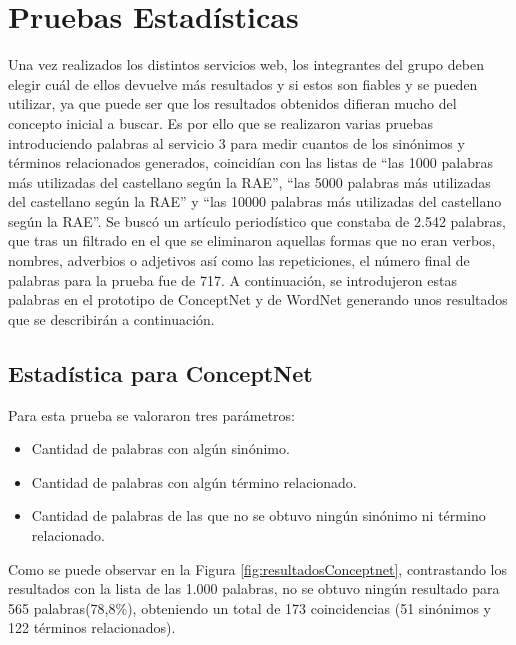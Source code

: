 \section{Pruebas Estadísticas}
\label{cap:sec:pruebasEstadisticas}
Una vez realizados los distintos servicios web, los integrantes del grupo deben elegir cuál de ellos devuelve más resultados y si estos son fiables y se pueden utilizar, ya que puede ser que los resultados obtenidos difieran mucho del concepto inicial a buscar.
Es por ello que se realizaron varias pruebas introduciendo palabras al servicio 3 para medir cuantos de los sinónimos y términos relacionados generados, coincidían con las listas de ``las 1000 palabras más utilizadas del castellano según la RAE'', ``las 5000 palabras más utilizadas del castellano según la RAE'' y ``las 10000 palabras más utilizadas del castellano según la RAE''. Se buscó un artículo periodístico que constaba de 2.542 palabras, que tras un filtrado en el que se eliminaron aquellas formas que no eran verbos, nombres, adverbios o adjetivos así como las repeticiones, el número final de palabras para la prueba fue de 717. A continuación, se introdujeron estas palabras en el prototipo de ConceptNet y de WordNet generando unos resultados que se describirán a continuación.

\subsection{Estadística para ConceptNet}
\label{cap:subsec:pruebaConceptnet}

Para esta prueba se valoraron tres parámetros:
\begin{itemize}
	\item Cantidad de palabras con algún sinónimo.
	\item Cantidad de palabras con algún término relacionado.
	\item Cantidad de palabras de las que no se obtuvo ningún sinónimo ni término relacionado.
\end{itemize}


Como se puede observar en la Figura \ref{fig:resultadosConceptnet}, contrastando los resultados con la lista de las 1.000 palabras, no se obtuvo ningún resultado para 565 palabras(78,8\%),  obteniendo un total de 173 coincidencias (51 sinónimos y 122 términos relacionados).


